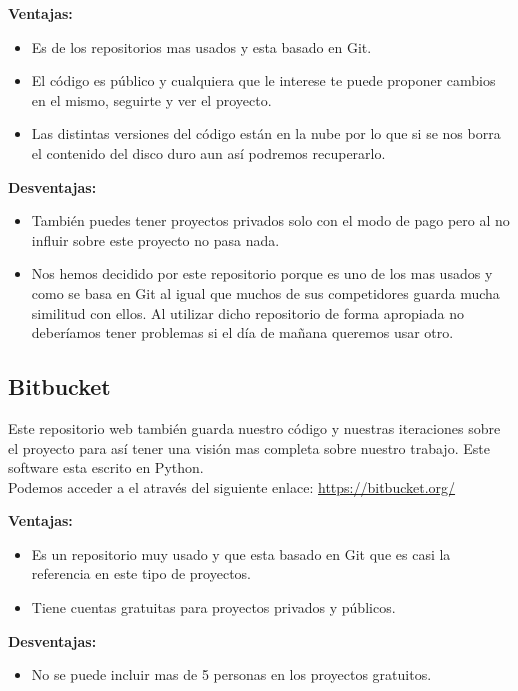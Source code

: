 \textbf{Ventajas:}

\begin{itemize}
\item Es de los repositorios mas usados y esta basado en Git.

\item El código es público y cualquiera que le interese te puede proponer cambios en el mismo, seguirte y ver el proyecto.

\item Las distintas versiones del código están en la nube por lo que si se nos borra el contenido del disco duro aun así podremos recuperarlo.
\end{itemize}

\textbf{Desventajas:}

\begin{itemize}
\item También puedes tener proyectos privados solo con el modo de pago pero al no influir sobre este proyecto no pasa nada.

\item Nos hemos decidido por este repositorio porque es uno de los mas usados y como se basa en Git al igual que muchos de sus competidores guarda mucha similitud con ellos.
Al utilizar dicho repositorio de forma apropiada no deberíamos tener problemas si el día de mañana queremos usar otro.
\end{itemize}

\subsection{Bitbucket}
Este repositorio web también guarda nuestro código y nuestras iteraciones sobre el proyecto para así tener una visión mas completa sobre nuestro trabajo.
Este software esta escrito en Python.\\
Podemos acceder a el através del siguiente enlace: 
\url{https://bitbucket.org/}


\textbf{Ventajas:}
\begin{itemize}

\item Es un repositorio muy usado y que esta basado en Git que es casi la referencia en este tipo de proyectos.

\item Tiene cuentas gratuitas para proyectos privados y públicos.

\end{itemize}

\textbf{Desventajas:}

\begin{itemize}
\item No se puede incluir mas de 5 personas en los proyectos gratuitos.
\end{itemize}





 
